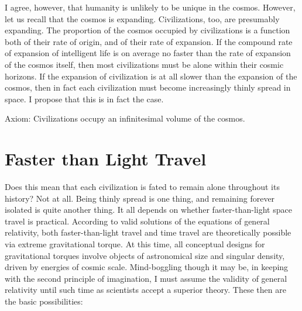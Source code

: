\documentclass[english,11pt,letterpaper,onecolumn]{scrbook}
\begin{document}
I agree, however, that humanity is unlikely to be unique in the cosmos.  However, let us recall that the cosmos is expanding.  Civilizations, too, are presumably expanding.  The proportion of the cosmos occupied by civilizations is a function both of their rate of origin, and of their rate of expansion.  If the compound rate of expansion of intelligent life is on average no faster than the rate of expansion of the cosmos itself, then most civilizations must be alone within their cosmic horizons.  If the expansion of civilization is at all slower than the expansion of the cosmos, then in fact each civilization must become increasingly thinly spread in space.  I propose that this is in fact the case.

Axiom: 	Civilizations occupy an infinitesimal volume of the cosmos.

\section{Faster than Light Travel}

Does this mean that each civilization is fated to remain alone throughout its history?  Not at all.  Being thinly spread is one thing, and remaining forever isolated is quite another thing.  It all depends on whether faster-than-light space travel is practical.  According to valid solutions of the equations of general relativity, both faster-than-light travel and time travel are theoretically possible via extreme gravitational torque.  At this time, all conceptual designs for gravitational torques involve objects of astronomical size and singular density, driven by energies of cosmic scale.  Mind-boggling though it may be, in keeping with the second principle of imagination, I must assume the validity of general relativity until such time as scientists accept a superior theory.  These then are the basic possibilities:
\end{document}
